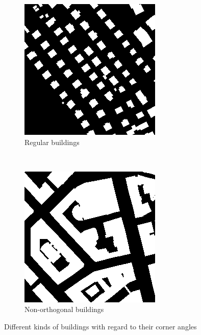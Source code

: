 \begin{figure}[H]
    \centering
	\begin{subfigure}{0.4\textwidth}
    	\includegraphics[width=0.9\linewidth]{chapters/challenges/images/regular_building_masks.png}		    \caption{Regular buildings}
    	\label{fig:challenges:regular_buildings}
	\end{subfigure}~
	\begin{subfigure}{0.4\textwidth}
    	\includegraphics[width=0.9\linewidth]{chapters/challenges/images/irregular_building_masks.png}       	\caption{Non-orthogonal buildings}
    	\label{fig:challenges:irregular_buildings}
	\end{subfigure}
	\caption{Different kinds of buildings with regard to their corner angles}
	\label{fig:challenges:building_ground_truths}
\end{figure}


